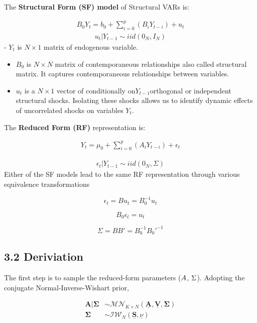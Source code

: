 \documentclass[
  letterpaper,
  DIV=11,
  numbers=noendperiod]{scrartcl}
\begin{document}
The \textbf{Structural Form (SF) model} of Structural VARs is:

\[
\begin{align}
B_{0} Y_{t} =b_{0}  + \sum_{i=0}^{p} (B_{i}Y_{t-i} )+u_{t} 
\end{align}
\] \[
\begin{align}
u_{t}|Y_{t-1} \sim iid(0_{N},I_{N}  )
\end{align}
\] - \(Y_{t}\) is \(N \times 1\) matrix of endogenous variable.

\begin{itemize}
\item
  \(B_{0}\) is \(N \times N\) matrix of contemporaneous relationships
  also called structural matrix. It captures contemporaneous
  relationships between variables.
\item
  \(u_{t}\) is a \(N \times 1\) vector of conditionally
  on\(Y_{t-1}\)orthogonal or independent structural shocks. Isolating
  these shocks allows us to identify dynamic effects of uncorrelated
  shocks on variables \(Y_{t}\).
\end{itemize}

The \textbf{Reduced Form (RF)} representation is:

\[
\begin{align}
Y_{t} =\mu_{0}  + \sum_{i=0}^{p} (A_{i}Y_{t-i} )+\epsilon_{t} 
\end{align}
\]

\[
\begin{align}
\epsilon_{t}|Y_{t-1} \sim iid(0_{N},\Sigma )
\end{align}
\] Either of the SF models lead to the same RF representation through
various equivalence transformations

\[
\epsilon_t = B u_t = B_0^{-1} u_t
\]

\[
B_0 \epsilon_t = u_t
\]

\[
\Sigma = BB' = B_0^{-1} B_0'^{-1}
\]

\hypertarget{deriviation}{%
\subsection{3.2 Deriviation}\label{deriviation}}

The first step is to sample the reduced-form parameters (\(\*A\),
\(\*\Sigma\)). Adopting the conjugate Normal-Inverse-Wishart prior,

\[
\begin{align*}
\mathbf{A}|\mathbf{\Sigma} &\sim \mathcal{MN}_{K \times N}(\underline{\mathbf{A}}, \underline{\mathbf{V}}, \mathbf{\Sigma}) \\
\mathbf{\Sigma} &\sim \mathcal{IW}_N(\underline{\mathbf{S}}, \underline{\nu})
\end{align*}
\]
\end{document}
